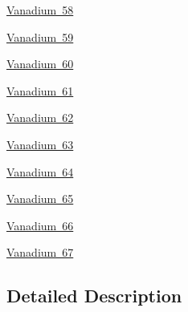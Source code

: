 \begin{DoxyCompactItemize}
\item 
\mbox{\hyperlink{group___isotope_const-_vanadium-_v58}{Vanadium 58}}
\item 
\mbox{\hyperlink{group___isotope_const-_vanadium-_v59}{Vanadium 59}}
\item 
\mbox{\hyperlink{group___isotope_const-_vanadium-_v60}{Vanadium 60}}
\item 
\mbox{\hyperlink{group___isotope_const-_vanadium-_v61}{Vanadium 61}}
\item 
\mbox{\hyperlink{group___isotope_const-_vanadium-_v62}{Vanadium 62}}
\item 
\mbox{\hyperlink{group___isotope_const-_vanadium-_v63}{Vanadium 63}}
\item 
\mbox{\hyperlink{group___isotope_const-_vanadium-_v64}{Vanadium 64}}
\item 
\mbox{\hyperlink{group___isotope_const-_vanadium-_v65}{Vanadium 65}}
\item 
\mbox{\hyperlink{group___isotope_const-_vanadium-_v66}{Vanadium 66}}
\item 
\mbox{\hyperlink{group___isotope_const-_vanadium-_v67}{Vanadium 67}}
\end{DoxyCompactItemize}


\subsection{Detailed Description}
